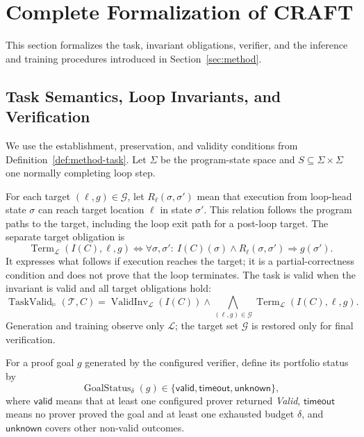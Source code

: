 \section{Complete Formalization of CRAFT}
\label{app:formal-method}

This section formalizes the task, invariant obligations, verifier, and the
inference and training procedures introduced in Section~\ref{sec:method}.

\subsection{Task Semantics, Loop Invariants, and Verification}
\label{app:formal-loop-verification}

We use the establishment, preservation, and validity conditions from
Definition~\ref{def:method-task}.  Let \(\Sigma\) be the program-state space
and \(S\subseteq\Sigma\times\Sigma\) one normally completing loop step.

For each target \((\ell,g)\in\mathcal G\), let \(R_\ell(\sigma,\sigma')\)
mean that execution from loop-head state \(\sigma\) can reach target location
\(\ell\) in state \(\sigma'\).  This relation follows the program paths to
the target, including the loop exit path for a post-loop target.  The separate
target obligation is
\begin{equation}
\operatorname{Term}_{\mathcal L}(I(C),\ell,g)
\iff \forall\sigma,\sigma':\
 I(C)(\sigma)\land R_\ell(\sigma,\sigma')
 \Rightarrow g(\sigma').
\label{eq:formal-target-obligation}
\end{equation}
It expresses what follows if execution reaches the target; it is a
partial-correctness condition and does not prove that the loop terminates.
The task is valid when the invariant is valid and all target obligations
hold:
\begin{equation}
\operatorname{TaskValid}_{\models}(\mathcal T,C)
=\operatorname{ValidInv}_{\mathcal L}(I(C))\land
  \bigwedge_{(\ell,g)\in\mathcal G}
  \operatorname{Term}_{\mathcal L}(I(C),\ell,g).
\label{eq:formal-verify}
\end{equation}
Generation and training observe only \(\mathcal L\); the target set
\(\mathcal G\) is restored only for final verification.

For a proof goal \(g\) generated by the configured verifier, define its
portfolio status by
\begin{equation}
  \operatorname{GoalStatus}_{\delta}(g)
  \in\{\mathsf{valid},\mathsf{timeout},\mathsf{unknown}\},
  \label{eq:formal-goal-status}
\end{equation}
where \(\mathsf{valid}\) means that at least one configured prover returned
\emph{Valid}, \(\mathsf{timeout}\) means no prover proved the goal and at
least one exhausted budget \(\delta\), and \(\mathsf{unknown}\) covers other
non-valid outcomes.

